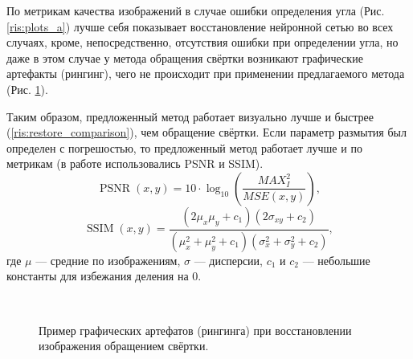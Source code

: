 По метрикам качества изображений в случае ошибки определения угла (Рис. \ref{ris:plots_a}) лучше себя показывает восстановление нейронной сетью во всех случаях, кроме, непосредственно, отсутствия ошибки при определении угла, но даже в этом случае у метода обращения свёртки возникают графические артефакты (рингинг), чего не происходит при применении предлагаемого метода (Рис. \ref{ris:ringing}).
\par
Таким образом, предложенный метод работает визуально лучше и быстрее (\ref{ris:restore_comparison}), чем обращение свёртки. Если параметр размытия был определен с погрешостью, то предложенный метод работает лучше и по метрикам (в работе использовались PSNR и SSIM).
$$
\operatorname{PSNR}(x, y)=10 \cdot \log _{10}\left(\frac{M A X_{I}^{2}}{M S E(x, y)}\right), 
$$
$$
\operatorname{SSIM}(x, y)=\frac{\left(2 \mu_{x} \mu_{y}+c_{1}\right)\left(2 \sigma_{x y}+c_{2}\right)}{\left(\mu_{x}^{2}+\mu_{y}^{2}+c_{1}\right)\left(\sigma_{x}^{2}+\sigma_{y}^{2}+c_{2}\right)},
$$
где $\mu$ --- средние по изображениям, $\sigma$ --- дисперсии, $c_1$ и $c_2$ --- небольшие константы для избежания деления на 0. %
\begin{figure}[H]
\centering
\begin{minipage}[t]{0.5\linewidth}
 \\ 
\end{minipage}
\caption{ Пример графических артефатов (рингинга) при восстановлении изображения обращением свёртки. }
\label{ris:ringing}
\end{figure}

